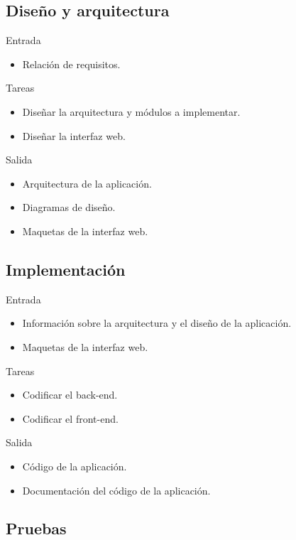 \subsection*{Diseño y arquitectura\label{ssec:dp:disenho}}

Entrada
\begin{itemize}[leftmargin=3.5em]
  \item Relación de requisitos.
\end{itemize}

Tareas
\begin{itemize}[leftmargin=3.5em]
  \item Diseñar la arquitectura y módulos a implementar.
  \item Diseñar la interfaz web.
\end{itemize}

Salida
\begin{itemize}[leftmargin=3.5em]
  \item Arquitectura de la aplicación.
  \item Diagramas de diseño.
  \item Maquetas de la interfaz web.
\end{itemize}

\subsection*{Implementación\label{ssec:dp:implementacion}}

Entrada
\begin{itemize}[leftmargin=3.5em]
  \item Información sobre la arquitectura y el diseño de la aplicación.
  \item Maquetas de la interfaz web.
\end{itemize}

Tareas
\begin{itemize}[leftmargin=3.5em]
  \item Codificar el \gls{back-end}.
  \item Codificar el \gls{front-end}.
\end{itemize}

Salida
\begin{itemize}[leftmargin=3.5em]
  \item Código de la aplicación.
  \item Documentación del código de la aplicación.
\end{itemize}

\subsection*{Pruebas\label{ssec:dp:pruebas}}


